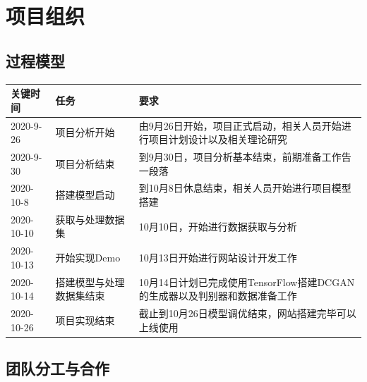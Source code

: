 \documentclass[hyperref, a4paper]{ctexart}
\begin{document}
\hypertarget{ux9879ux76eeux7ec4ux7ec7}{%
\section{项目组织}\label{ux9879ux76eeux7ec4ux7ec7}}

\hypertarget{ux8fc7ux7a0bux6a21ux578b}{%
\subsection{过程模型}\label{ux8fc7ux7a0bux6a21ux578b}}

\begin{table}[H]
\small 
\begin{center}  
\begin{tabular}{|p{1.5cm}|p{3cm}|p{5cm}|}  
\hline  
 关键时间 & 任务 & 要求  \\ \hline  
2020-9-26 & 项目分析开始 & 由9月26日开始，项目正式启动，相关人员开始进行项目计划设计以及相关理论研究\\  \hline
2020-9-30 & 项目分析结束 & 到9月30日，项目分析基本结束，前期准备工作告一段落\\  \hline
2020-10-8 & 搭建模型启动 & 到10月8日休息结束，相关人员开始进行项目模型搭建\\  \hline
2020-10-10 & 获取与处理数据集& 10月10日，开始进行数据获取与分析 \\  \hline  
2020-10-13 & 开始实现Demo& 10月13日开始进行网站设计开发工作 \\  \hline  
2020-10-14 & 搭建模型与处理数据集结束& 10月14日计划已完成使用TensorFlow搭建DCGAN的生成器以及判别器和数据准备工作 \\  \hline  
2020-10-26 & 项目实现结束 & 截止到10月26日模型调优结束，网站搭建完毕可以上线使用 \\ \hline  
\end{tabular}  
\end{center}  
\end{table}

\hypertarget{ux56e2ux961fux5206ux5de5ux4e0eux5408ux4f5c}{%
\subsection{团队分工与合作}\label{ux56e2ux961fux5206ux5de5ux4e0eux5408ux4f5c}}
\end{document}
